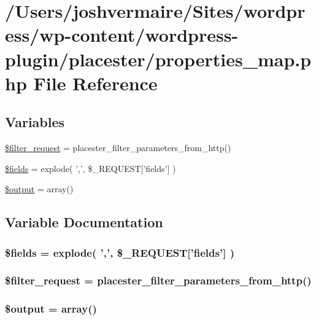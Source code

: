 \hypertarget{properties__map_8php}{
\section{/Users/joshvermaire/Sites/wordpress/wp-\/content/wordpress-\/plugin/placester/properties\_\-map.php File Reference}
\label{d4/d63/properties__map_8php}
}
\subsection*{Variables}
\begin{DoxyCompactItemize}
\item 
\hyperlink{properties__map_8php_a867e2cebab27257f0c333daace141858}{\$filter\_\-request} = placester\_\-filter\_\-parameters\_\-from\_\-http()
\item 
\hyperlink{properties__map_8php_ab2303c817e3b402b77b7f99627b9c319}{\$fields} = explode( ',', \$\_\-REQUEST\mbox{[}'fields'\mbox{]} )
\item 
\hyperlink{properties__map_8php_a73004ce9cd673c1bfafd1dc351134797}{\$output} = array()
\end{DoxyCompactItemize}


\subsection{Variable Documentation}
\hypertarget{properties__map_8php_ab2303c817e3b402b77b7f99627b9c319}{
\subsubsection[{\$fields}]{\setlength{\rightskip}{0pt plus 5cm}\$fields = explode( ',', \$\_\-REQUEST\mbox{[}'fields'\mbox{]} )}}
\label{d4/d63/properties__map_8php_ab2303c817e3b402b77b7f99627b9c319}
\hypertarget{properties__map_8php_a867e2cebab27257f0c333daace141858}{
\subsubsection[{\$filter\_\-request}]{\setlength{\rightskip}{0pt plus 5cm}\$filter\_\-request = placester\_\-filter\_\-parameters\_\-from\_\-http()}}
\label{d4/d63/properties__map_8php_a867e2cebab27257f0c333daace141858}
\hypertarget{properties__map_8php_a73004ce9cd673c1bfafd1dc351134797}{
\subsubsection[{\$output}]{\setlength{\rightskip}{0pt plus 5cm}\$output = array()}}
\label{d4/d63/properties__map_8php_a73004ce9cd673c1bfafd1dc351134797}
